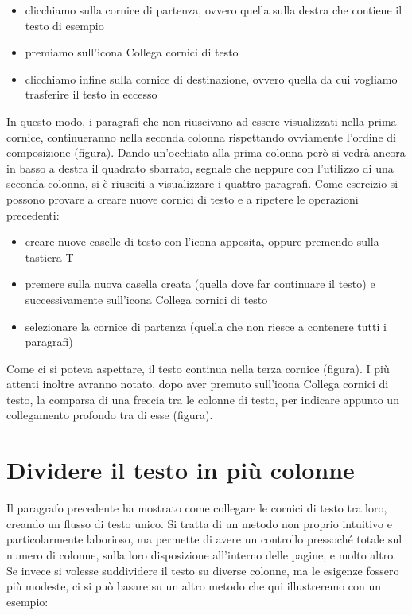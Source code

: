 \documentclass[a4paper, 12pt]{book}
\begin{document}
\begin{itemize}
	\item clicchiamo sulla cornice di partenza, ovvero quella sulla destra che contiene il testo di esempio

	\item premiamo sull'icona Collega cornici di testo

	\item clicchiamo infine sulla cornice di destinazione, ovvero quella da cui vogliamo trasferire il testo in eccesso
\end{itemize}

In questo modo, i paragrafi che non riuscivano ad essere visualizzati nella prima cornice, continueranno nella seconda colonna rispettando ovviamente l'ordine di composizione (figura). Dando un'occhiata alla prima colonna però si vedrà ancora in basso a destra il quadrato sbarrato, segnale che neppure con l'utilizzo di una seconda colonna, si è riusciti a visualizzare i quattro paragrafi. Come esercizio si possono provare a creare nuove cornici di testo e a ripetere le operazioni precedenti:
\begin{itemize}
	
	\item creare nuove caselle di testo con l'icona apposita, oppure premendo sulla tastiera T

	\item premere sulla nuova casella creata (quella dove far continuare il testo) e successivamente sull'icona Collega cornici di testo

	\item selezionare la cornice di partenza (quella che non riesce a contenere tutti i paragrafi)
\end{itemize}

Come ci si poteva aspettare, il testo continua nella terza cornice (figura). I più attenti inoltre avranno notato, dopo aver premuto sull'icona Collega cornici di testo, la comparsa di una freccia tra le colonne di testo, per indicare appunto un collegamento profondo tra di esse (figura).

\section{Dividere il testo in più colonne}
Il paragrafo precedente ha mostrato come collegare le cornici di testo tra loro, creando un flusso di testo unico. Si tratta di un metodo non proprio intuitivo e particolarmente laborioso, ma permette di avere un controllo pressoché totale sul numero di colonne, sulla loro disposizione all'interno delle pagine, e molto altro. Se invece si volesse suddividere il testo su diverse colonne, ma le esigenze fossero più modeste, ci si può basare su un altro metodo che qui illustreremo con un esempio:
\end{document}
